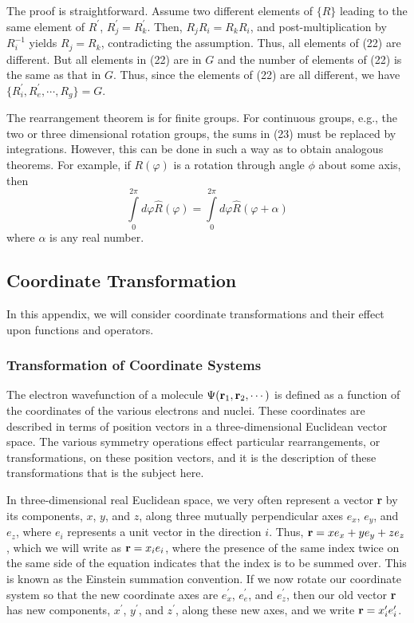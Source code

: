 The proof is straightforward.  Assume two different elements of 
$\{R\}$ leading to the same element of $R^{\prime}$, $R^{\prime}_j = 
R_k^{\prime}$.  Then, $R_jR_i = R_kR_i$, and post-multiplication by 
$R_i^{-1}$ yields $R_j = R_k$, contradicting the assumption.  Thus, 
all elements of (22) are different.  But all elements in (22) are in 
$G$ and the number of elements of (22) is the same as that in $G$.  
Thus, since the elements of (22) are all different, we have 
$\{R^{\prime}_i , R^{\prime}_e , \cdots , R_g \} = G$.

The rearrangement theorem is for finite groups.  For continuous 
groups, e.g., the two or three dimensional rotation groups, the sums 
in (23) must be replaced by integrations.  However, this can be done in 
such a way as to obtain analogous theorems.  For example, if 
$R(\varphi)$ is a rotation through angle $\phi$ about some axis, then
\begin{equation}
\int\limits^{2\pi}_{0} d \varphi {\hat{R}} ( \varphi ) = 
\int\limits^{2\pi}_{0} d \varphi {\hat{R}} ( \varphi + \alpha )
\end{equation}
where $\alpha$ is any real number.

\subsection{Coordinate Transformation}

In this appendix, we will consider coordinate transformations and 
their effect upon functions and operators.

\subsubsection{Transformation of Coordinate Systems}

The electron wavefunction of a molecule $\Psi( {\bf r}_1 , {\bf 
r}_2 , \cdots )$ is defined as a function of the coordinates of the 
various electrons and nuclei. These coordinates are described in terms 
of position vectors in a three-dimensional Euclidean vector space.  
The various symmetry operations effect particular rearrangements, or 
transformations, on these position vectors, and it is the description 
of these transformations that is the subject here.

In three-dimensional real Euclidean space, we very often represent a 
vector {\bf r} by its components, $x$, $y$, and $z$, along three 
mutually perpendicular axes $e_x$, $e_y$, and $e_z$, where $e_i$ 
represents a unit vector in the direction $i$.  Thus, ${\bf r} = 
xe_x + ye_y + ze_z$, which we will write as ${\bf r} = x_ie_i$, where 
the presence of the same index twice on the same side of the equation 
indicates that the index is to be summed over.  This is known as the 
Einstein summation convention.  If we now rotate our coordinate 
system so that the new coordinate axes are $e^{\prime}_x$, 
$e^{\prime}_e$, and $e^{\prime}_z$, then our old vector {\bf r} has 
new components, $x^{\prime}$, $y^{\prime}$, and $z^{\prime}$, along 
these new axes, and we write ${\bf r} = x^{\prime}_i e^{\prime}_i$.

